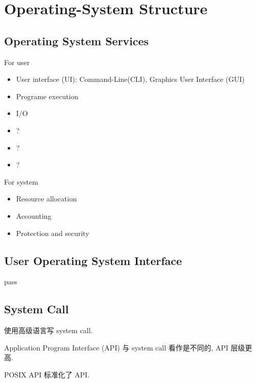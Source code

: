 \newpage
\section{Operating-System Structure}

\subsection{Operating System Services}
For user
\begin{itemize}
    \item User interface (UI): Command-Line(CLI), Graphics User Interface (GUI)
    \item Programe execution
    \item I/O
    \item ?
    \item ?
    \item ?
\end{itemize}

For system
\begin{itemize}
    \item Resource allocation
    \item Accounting
    \item Protection and security
\end{itemize}

\subsection{User Operating System Interface}
pass

\subsection{System Call}
使用高级语言写 system call. 

Application Program Interface (API) 与 system call 看作是不同的, API 层级更高. 

POSIX API 标准化了 API.


